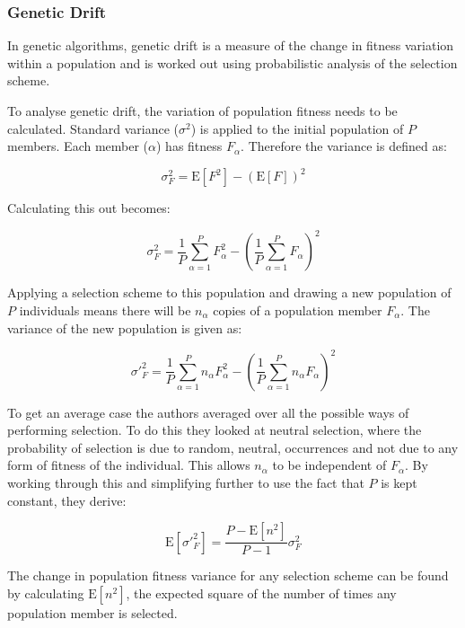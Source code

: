 \documentclass[10pt, a4paper]{article}
\begin{document}
\subsubsection{Genetic Drift} 
In genetic algorithms, genetic drift is a measure of the change in fitness
variation within a population and is worked out using probabilistic analysis of
the selection scheme. 

To analyse genetic drift, the variation of population fitness needs to be
calculated. Standard variance ($\sigma^2$) is applied to the initial population
of $P$ members. Each member ($\alpha$) has fitness $F_\alpha$. Therefore the
variance is defined as:

\begin{equation}
\sigma_F^2 = \text{E}[F^2] - (\text{E}[F])^2
\end{equation}

Calculating this out becomes:

\begin{equation}
\sigma_F^2 = \frac{1}{P}\sum^{P}_{\alpha=1}{F^{2}_{\alpha}} - \left(
\frac{1}{P}\sum^{P}_{\alpha=1}{F_{\alpha}}\right)^2
\end{equation}

Applying a selection scheme to this population and drawing a new population of
$P$ individuals means there will be $n_\alpha$ copies of a population member
$F_\alpha$. The variance of the new population is given as:

\begin{equation}
\sigma'^2_F = \frac{1}{P} \sum^{P}_{\alpha=1}{n_\alpha F^2_\alpha} - \left(
\frac{1}{P} \sum^P_{\alpha=1}{n_\alpha F_\alpha}\right)^2
\end{equation}

To get an average case the authors averaged over all the possible ways of
performing selection. To do this they looked at neutral selection, where the
probability of selection is due to random, neutral, occurrences and not due to
any form of fitness of the individual. This allows $n_\alpha$ to be independent
of $F_\alpha$. By working through this and simplifying further to use the fact
that $P$ is kept constant, they derive:

\begin{equation}
\text{E}[\sigma'^2_F] = \frac{P - \text{E}[n^2]}{P-1}\sigma^2_F
\label{eq:average-case}
\end{equation}

The change in population fitness variance for any selection scheme can be found
by calculating $\text{E}[n^2]$, the expected square of the number of times any
population member is selected.
\end{document}
